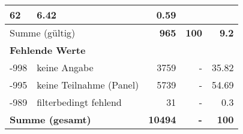 \begin{longtable}{lXrrr}
       \num{62} &
       \num[round-mode=places,round-precision=2]{6,42} &
         \num[round-mode=places,round-precision=2]{0,59} \\
     \midrule
     \multicolumn{2}{l}{Summe (gültig)} &
       \textbf{\num{965}} &
     \textbf{100} &
       \textbf{\num[round-mode=places,round-precision=2]{9,2}} \\
     \multicolumn{5}{l}{\textbf{Fehlende Werte}}\\
       -998 &
       keine Angabe &
         \num{3759} &
        - &
         \num[round-mode=places,round-precision=2]{35,82} \\
       -995 &
       keine Teilnahme (Panel) &
         \num{5739} &
        - &
         \num[round-mode=places,round-precision=2]{54,69} \\
       -989 &
       filterbedingt fehlend &
         \num{31} &
        - &
         \num[round-mode=places,round-precision=2]{0,3} \\
     \midrule
     \multicolumn{2}{l}{\textbf{Summe (gesamt)}} &
          \textbf{\num{10494}} &
        \textbf{-} &
        \textbf{100} \\
     \bottomrule
     \end{longtable}
     
